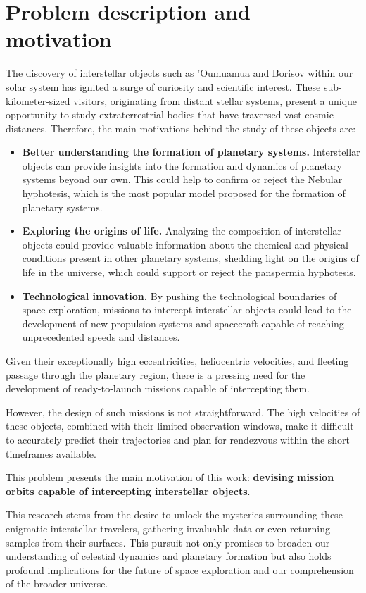 \section{Problem description and motivation}

The discovery of interstellar objects such as 'Oumuamua and Borisov within our
solar system has ignited a surge of curiosity and scientific interest. These
sub-kilometer-sized visitors, originating from distant stellar systems, present
a unique opportunity to study extraterrestrial bodies that have traversed vast
cosmic distances. Therefore, the main motivations behind the study of these
objects are:

\begin{itemize}

  \item \textbf{Better understanding the formation of planetary systems.}
        Interstellar objects can provide insights into the formation and
        dynamics of planetary systems beyond our own. This could help to
        confirm or reject the Nebular hyphotesis, which is the most popular
        model proposed for the formation of planetary systems.

  \item \textbf{Exploring the origins of life.} Analyzing the composition of
        interstellar objects could provide valuable information about the
        chemical and physical conditions present in other planetary
        systems, shedding light on the origins of life in the universe, which
        could support or reject the panspermia hyphotesis.

  \item \textbf{Technological innovation.} By pushing the technological
        boundaries of space exploration, missions to intercept interstellar
        objects could lead to the development of new propulsion systems and
        spacecraft capable of reaching unprecedented speeds and distances.

\end{itemize}

Given their exceptionally high eccentricities, heliocentric velocities, and
fleeting passage through the planetary region, there is a pressing need for the
development of ready-to-launch missions capable of intercepting them.

However, the design of such missions is not straightforward. The high velocities
of these objects, combined with their limited observation windows, make it
difficult to accurately predict their trajectories and plan for rendezvous
within the short timeframes available.

This problem presents the main motivation of this work: \textbf{devising mission
  orbits capable of intercepting interstellar objects}.

This research stems from the desire to unlock the mysteries surrounding these
enigmatic interstellar travelers, gathering invaluable data or even returning
samples from their surfaces. This pursuit not only promises to broaden our
understanding of celestial dynamics and planetary formation but also holds
profound implications for the future of space exploration and our comprehension
of the broader universe.
